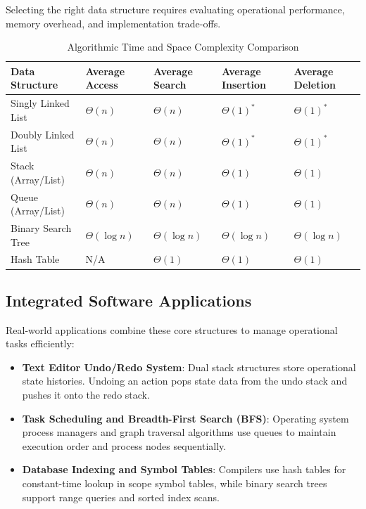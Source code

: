 \documentclass[12pt]{report}
\begin{document}
Selecting the right data structure requires evaluating operational performance, memory overhead, and implementation trade-offs.

\begin{table}[h!]
\centering
\caption{Algorithmic Time and Space Complexity Comparison}
\label{tab:complexity_comparison}
\begin{tabularx}{\textwidth}{@{} >{\raggedright\arraybackslash}p{2.8cm} X X X X @{}}
\toprule
\textbf{Data Structure} & \textbf{Average Access} & \textbf{Average Search} & \textbf{Average Insertion} & \textbf{Average Deletion} \\
\midrule
Singly Linked List & $\Theta(n)$ & $\Theta(n)$ & $\Theta(1)^*$ & $\Theta(1)^*$ \\
Doubly Linked List & $\Theta(n)$ & $\Theta(n)$ & $\Theta(1)^*$ & $\Theta(1)^*$ \\
Stack (Array/List) & $\Theta(n)$ & $\Theta(n)$ & $\Theta(1)$ & $\Theta(1)$ \\
Queue (Array/List) & $\Theta(n)$ & $\Theta(n)$ & $\Theta(1)$ & $\Theta(1)$ \\
Binary Search Tree & $\Theta(\log n)$ & $\Theta(\log n)$ & $\Theta(\log n)$ & $\Theta(\log n)$ \\
Hash Table & N/A & $\Theta(1)$ & $\Theta(1)$ & $\Theta(1)$ \\
\bottomrule
\end{tabularx}
\end{table}


\subsection{Integrated Software Applications}

Real-world applications combine these core structures to manage operational tasks efficiently:
\begin{itemize}
    \item \textbf{Text Editor Undo/Redo System}: Dual stack structures store operational state histories. Undoing an action pops state data from the undo stack and pushes it onto the redo stack.
    \item \textbf{Task Scheduling and Breadth-First Search (BFS)}: Operating system process managers and graph traversal algorithms use queues to maintain execution order and process nodes sequentially.
    \item \textbf{Database Indexing and Symbol Tables}: Compilers use hash tables for constant-time lookup in scope symbol tables, while binary search trees support range queries and sorted index scans.
\end{itemize}
\end{document}
